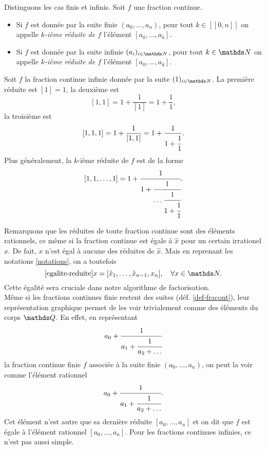 \begin{definition}
	Distinguons les cas finis et infinis. Soit $f$ une fraction
	continue.
	\begin{itemize}
		\item Si $f$ est donnée par la suite finie $(a_0, \dots, a_n)$, pour
		tout $k\in [\![0, n]\!]$ on appelle \emph{$k$-ième réduite de $f$}
		l'élément $[a_0, \dots, a_k]$.
		\item Si $f$ est donnée par la suite infinie $(a_i)_{i\in \N}$, pour
		tout $k\in \N$ on appelle \emph{$k$-ième réduite de $f$} l'élément
		$[a_0, \dots, a_k]$.
	\end{itemize}
\end{definition}

\begin{exemple}
	Soit $f$ la fraction continue infinie donnée par la suite $(1)_{i\in \N}$.
	La première réduite est $[1] = 1$, la deuxième est \[[1, 1] = 1 +
	\frac{1}{[1]} = 1 + \frac{1}{1},\] la troisième est \[[1, 1, 1] = 1 +
	\frac{1}{[1, 1]} = 1 + \frac{1}{1 + \cfrac{1}{1}}.\] Plus généralement, la
	$k$-ième réduite de $f$ est de la forme \[[1, 1, \dots, 1] = 1 +
	\cfrac{1}{1 + \cfrac{1}{\dots \\ \cfrac{1}{1 +
	\cfrac{1}{1}}}}.\]
\end{exemple}

Remarquons que les réduites de toute fraction continue sont des éléments
rationnels, ce même si la fraction continue est égale à $\hat{x}$ pour un
certain irrationel $x$. De fait, $x$ n'est égal à aucune des réduites de
$\hat{x}$. Mais en reprenant les notations \ref{notations}, on a toutefois
\begin{equation} \ref{egalite-reduite}
	x = [\hat{x}_1, \dots, \hat{x}_{n-1}, x_n], \quad \forall x\in \N.
\end{equation}
Cette égalité sera cruciale dans notre algorithme de factorisation. \\

Même si les fractions continues finie restent des suites (déf.
\ref{def-fracont}), leur représentation graphique permet de les voir
trivialement comme des éléments du corps $\Q$. En effet, en représentant \[a_0
+ \cfrac{1}{a_1 + \cfrac{1}{a_2 + \dots}}\] la fraction continue finie $f$
associée à la suite finie $(a_0, \dots, a_n)$, on peut la voir comme l'élément
rationnel \[a_0 + \cfrac{1}{a_1 + \cfrac{1}{a_2 + \dots}}.\] Cet élément n'est
autre que sa dernière réduite $[a_0, \dots, a_n]$ et on dit que $f$ est égale à
l'élément rationnel $[a_0, \dots, a_n]$. Pour les fractions continues infinies,
ce n'est pas aussi simple.

